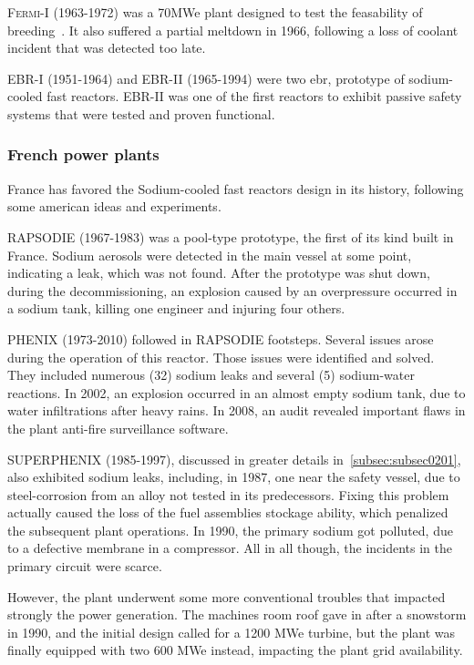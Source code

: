 \textsc{Fermi-I} (1963-1972) was a 70MWe plant designed to test the feasability of breeding~\cite{fermi1}. It also suffered a partial meltdown in 1966, following a loss of coolant incident that was detected too late.


\textsc{EBR-I} (1951-1964) and \textsc{EBR-II} (1965-1994) were two \gls{ebr}, prototype of sodium-cooled fast reactors. EBR-II was one of the first reactors to exhibit passive safety systems that were tested and proven functional.

\subsubsection{French power plants}
\label{subsubsec1:france}

France has favored the Sodium-cooled fast reactors design in its history, following some american ideas and experiments.

\textsc{RAPSODIE} (1967-1983) was a pool-type prototype, the first of its kind built in France. Sodium aerosols were detected in the main vessel at some point, indicating a leak, which was not found. After the prototype was shut down, during the decommissioning, an explosion caused by an overpressure occurred in a sodium tank, killing one engineer and injuring four others.

\textsc{PHENIX} (1973-2010) followed in RAPSODIE footsteps. Several issues arose during the operation of this reactor. Those issues were identified and solved. They included numerous (32) sodium leaks and several (5) sodium-water reactions. In 2002, an explosion occurred in an almost empty sodium tank, due to water infiltrations after heavy rains. In 2008, an audit revealed important flaws in the plant anti-fire surveillance software.

\textsc{SUPERPHENIX} (1985-1997), discussed in greater details in~\ref{subsec:subsec0201}, also exhibited sodium leaks, including, in 1987, one near the safety vessel, due to steel-corrosion from an alloy not tested in its predecessors. Fixing this problem actually caused the loss of the fuel assemblies stockage ability, which penalized the subsequent plant operations. In 1990, the primary sodium got polluted, due to a defective membrane in a compressor. All in all though, the incidents in the primary circuit were scarce.

However, the plant underwent some more conventional troubles that impacted strongly the power generation. The machines room roof gave in after a snowstorm in 1990, and the initial design called for a 1200 MWe turbine, but the plant was finally equipped with two 600 MWe instead, impacting the plant grid availability.



